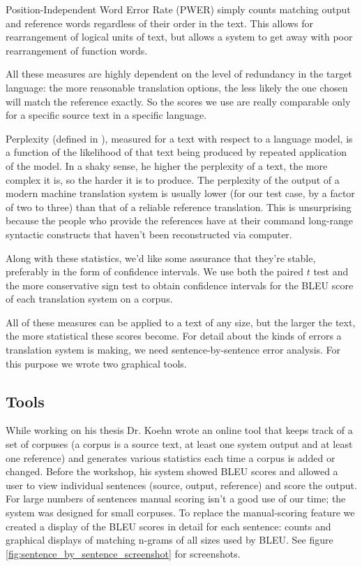 \documentclass[10pt]{report}
\theoremstyle{plain}
\begin{document}
{Position-Independent Word Error Rate (PWER) simply counts matching output and reference words regardless of their order in the text. This allows for rearrangement of logical units of text, but allows a system to get away with poor rearrangement of function words.

All these measures are highly dependent on the level of redundancy in the target language: the more reasonable translation options, the less likely the one chosen will match the reference exactly. So the scores we use are really comparable only for a specific source text in a specific language.

Perplexity (defined in \cite{perplexity}), measured for a text with respect to a language model, is a function of the likelihood of that text being produced by repeated application of the model. In a shaky sense, he higher the perplexity of a text, the more complex it is, so the harder it is to produce. The perplexity of the output of a modern machine translation system is usually lower (for our test case, by a factor of two to three) than that of a reliable reference translation. This is unsurprising because the people who provide the references have at their command long-range syntactic constructs that haven't been reconstructed via computer.

Along with these statistics, we'd like some assurance that they're stable, preferably in the form of confidence intervals. We use both the paired $t$ test and the more conservative sign test to obtain confidence intervals for the BLEU score of each translation system on a corpus.

All of these measures can be applied to a text of any size, but the larger the text, the more statistical these scores become. For detail about the kinds of errors a translation system is making, we need sentence-by-sentence error analysis. For this purpose we wrote two graphical tools.

\subsection{Tools}
While working on his thesis Dr. Koehn wrote an online tool that keeps track of a set of corpuses (a corpus is a source text, at least one system output and at least one reference) and generates various statistics each time a corpus is added or changed. Before the workshop, his system showed BLEU scores and allowed a user to view individual sentences (source, output, reference) and score the output. For large numbers of sentences manual scoring isn't a good use of our time; the system was designed for small corpuses. To replace the manual-scoring feature we created a display of the BLEU scores in detail for each sentence: counts and graphical displays of matching n-grams of all sizes used by BLEU. See figure \ref{fig:sentence_by_sentence_screenshot} for screenshots.

}
\end{document}
